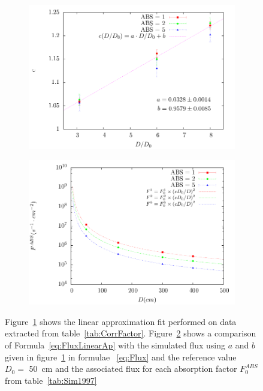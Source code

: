 	\begin{figure}[H]
		\begin{subfigure}{\linewidth}
			\centering
			\includegraphics[width = 0.8\plotwidth]{fig/chapt5/flux_correction.pdf}\\
			\caption{\label{fig:CorrFactor:A}}
		\end{subfigure}
		\begin{subfigure}{\linewidth}
			\centering
			\includegraphics[width = 0.8\plotwidth]{fig/chapt5/correction_model.pdf}
			\caption{\label{fig:CorrFactor:B}}
		\end{subfigure}
		\caption{\label{fig:CorrFactor} Figure~\ref{fig:CorrFactor:A} shows the linear approximation fit performed on data extracted from table~\ref{tab:CorrFactor}. Figure~\ref{fig:CorrFactor:B} shows a comparison of Formula~\ref{eq:FluxLinearAp} with the simulated flux using $a$ and $b$ given in figure~\ref{fig:CorrFactor:A} in formulae ~\ref{eq:Flux} and the reference value $D_0 =$ \SI{50}{cm} and the associated flux for each absorption factor $F_0^{ABS}$ from table~\ref{tab:Sim1997}}
	\end{figure}
	
